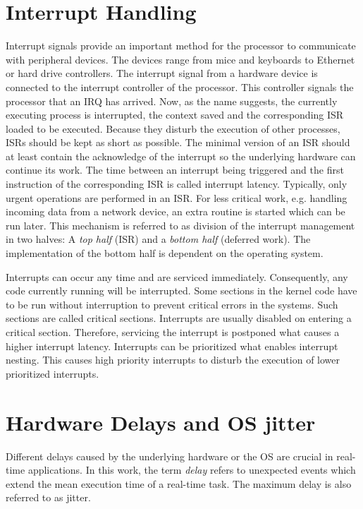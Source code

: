 \section{Interrupt Handling}\label{s_interrupt_handling}
Interrupt signals provide an important method for the processor to communicate with peripheral devices.
The devices range from mice and keyboards to Ethernet or hard drive controllers.
The interrupt signal from a hardware device is connected to the interrupt controller of the processor. 
This controller signals the processor that an \ac{IRQ} has arrived.
Now, as the name suggests, the currently executing process is interrupted, the context saved and the corresponding \ac{ISR} loaded to be executed.
Because they disturb the execution of other processes, \acp{ISR} should be kept as short as possible.
The minimal version of an \ac{ISR} should at least contain the acknowledge of the interrupt so the underlying hardware can continue its work.
The time between an interrupt being triggered and the first instruction of the corresponding \ac{ISR} is called interrupt latency.
Typically, only urgent operations are performed in an \ac{ISR}. 
For less critical work, e.g. handling incoming data from a network device, an extra routine is started which can be run later.
This mechanism is referred to as division of the interrupt management in two halves: A \textit{top half} (\ac{ISR}) and a \textit{bottom half} (deferred work).
The implementation of the bottom half is dependent on the operating system. 
\par
Interrupts can occur any time and are serviced immediately.
Consequently, any code currently running will be interrupted.
Some sections in the kernel code have to be run without interruption to prevent critical errors in the systems.
Such sections are called critical sections.
Interrupts are usually disabled on entering a critical section.
Therefore, servicing the interrupt is postponed what causes a higher interrupt latency.
Interrupts can be prioritized what enables interrupt nesting.
This causes high priority interrupts to disturb the execution of lower prioritized interrupts.
 
\section{Hardware Delays and \ac{OS} jitter}\label{s_hardware_delays_and_os_jitter}
Different delays caused by the underlying hardware or the \ac{OS} are crucial in real-time applications.
In this work, the term \textit{delay} refers to unexpected events which extend the mean execution time of a real-time task.
The maximum delay is also referred to as jitter.  

